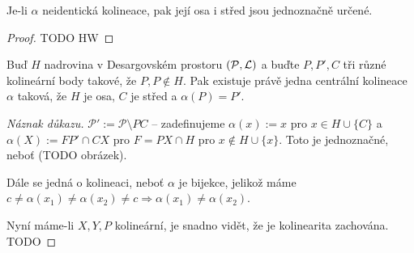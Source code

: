 \begin{consequence}
    Je-li $\alpha$ neidentická kolineace, pak její osa i střed jsou jednoznačně určené.
\end{consequence}
\begin{proof}
    TODO HW
\end{proof}


\begin{theorem}[Baerova]
    Buď $H$ nadrovina v Desargovském prostoru $(\mathcal{P},\operatorname{\mathcal{L}})$ a buďte $P,P', C$ tři různé kolineární body takové, že $P,P\not\in H$.
    Pak existuje právě jedna centrální kolineace $\alpha$ taková, že $H$ je osa, $C$ je střed a $\alpha(P)=P'$.
\end{theorem}
\begin{proof}[Náznak důkazu]
    $\mathcal{P}':=\mathcal{P}\setminus PC$ -- zadefinujeme $\alpha(x) := x$ pro $x\in H\cup \{C\}$ a $\alpha(X) := FP'\cap CX$ pro $F=PX\cap H$ pro $x\not\in H\cup \{x\}$.
    Toto je jednoznačné, neboť (TODO obrázek).

    Dále se jedná o kolineaci, neboť $\alpha$ je bijekce, jelikož máme $c\neq \alpha(x_1)\neq\alpha(x_2)\neq c\Rightarrow \alpha(x_1)\neq\alpha(x_2)$.

    Nyní máme-li $X,Y,P$ kolineární, je snadno vidět, že je kolinearita zachována.
    TODO
\end{proof}

